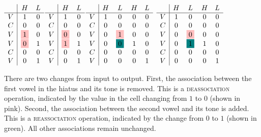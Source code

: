 \documentclass{article}[12pt]
\begin{document}
$
\begin{array}{c|ccc}
& H & L \\
\hline
V & 1 & 0 \\
C & 0 & 0 \\
V & \colorbox{pink}{1} & 0\\
V & \colorbox{pink}{0} & 1\\
C & 0 & 0 \\
V & 0 & 1 \\
\end{array}
$$
\begin{array}{c|ccc}
& H & L \\
\hline
V & 1 & 0 \\
C & 0 & 0 \\
V & \colorbox{pink}{0} & 0\\
V & \colorbox{pink}{1} & 1\\
C & 0 & 0 \\
V & 0 & 1 \\
\end{array}
$\hfill $
\begin{array}{c|cccc}
& H & L & H & L \\
\hline
V & 1 & 0 & 0 & 0\\
C & 0 & 0 & 0 & 0\\
V & 0 & \colorbox{pink}{1}  & 0 & 0\\
V & 0 & \colorbox{teal}{0} & 1 & 0\\
C & 0 & 0 & 0 & 0\\
V & 0 & 0 & 0 & 1\\
\end{array}
$
\quad $
\begin{array}{c|cccc}
& H & L & H & L \\
\hline
V & 1 & 0 & 0 & 0\\
C & 0 & 0 & 0 & 0\\
V & 0 & \colorbox{pink}{0}  & 0 & 0\\
V & 0 & \colorbox{teal}{1} & 1 & 0\\
C & 0 & 0 & 0 & 0\\
V & 0 & 0 & 0 & 1\\
\end{array}
$

There are two changes from input to output. First, the association
between the first vowel in the hiatus and its tone is removed. This is
a \textsc{deassociation} operation, indicated by the value in the cell
changing from \(1\) to \(0\) (shown in pink). Second, the association
between the second vowel and its tone is added. This is a
\textsc{reassociation} operation, indicated by the change from \(0\) to
\(1\) (shown in green). All other associations remain unchanged.
\end{document}
